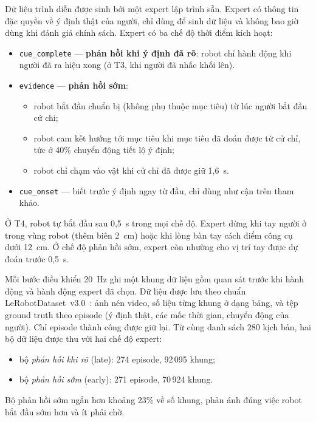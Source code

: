 Dữ liệu trình diễn được sinh bởi một expert lập trình sẵn. Expert có thông tin đặc quyền về ý định thật của người, chỉ dùng để sinh dữ liệu và không bao giờ dùng khi đánh giá chính sách. Expert có ba chế độ thời điểm kích hoạt:
\begin{itemize}
  \item \texttt{cue\_complete} --- \textbf{phản hồi khi ý định đã rõ}: robot chỉ hành động khi người đã ra hiệu xong (ở T3, khi người đã nhấc khối lên).
  \item \texttt{evidence} --- \textbf{phản hồi sớm}:
    \begin{itemize}
      \item robot bắt đầu chuẩn bị (không phụ thuộc mục tiêu) từ lúc người bắt đầu cử chỉ;
      \item robot cam kết hướng tới mục tiêu khi mục tiêu đã đoán được từ cử chỉ, tức ở 40\% chuyển động tiết lộ ý định;
      \item robot chỉ chạm vào vật khi cử chỉ đã được giữ 1,6~s.
    \end{itemize}
  \item \texttt{cue\_onset} --- biết trước ý định ngay từ đầu, chỉ dùng như cận trên tham khảo.
\end{itemize}

Ở T4, robot tự bắt đầu sau 0,5~s trong mọi chế độ. Expert dừng khi tay người ở trong vùng robot (thêm biên 2~cm) hoặc khi lòng bàn tay cách điểm công cụ dưới 12~cm. Ở chế độ phản hồi sớm, expert còn nhường cho vị trí tay được dự đoán trước 0,5~s.

Mỗi bước điều khiển 20~Hz ghi một khung dữ liệu gồm quan sát trước khi hành động và hành động expert đã chọn. Dữ liệu được lưu theo chuẩn LeRobotDataset~v3.0~\cite{cadene2026lerobot}: ảnh nén video, số liệu từng khung ở dạng bảng, và tệp ground truth theo episode (ý định thật, các mốc thời gian, chuyển động của người). Chỉ episode thành công được giữ lại. Từ cùng danh sách 280 kịch bản, hai bộ dữ liệu được thu với hai chế độ expert:
\begin{itemize}
  \item bộ \emph{phản hồi khi rõ} (late): 274 episode, 92\,095 khung;
  \item bộ \emph{phản hồi sớm} (early): 271 episode, 70\,924 khung.
\end{itemize}
Bộ phản hồi sớm ngắn hơn khoảng 23\% về số khung, phản ánh đúng việc robot bắt đầu sớm hơn và ít phải chờ.
